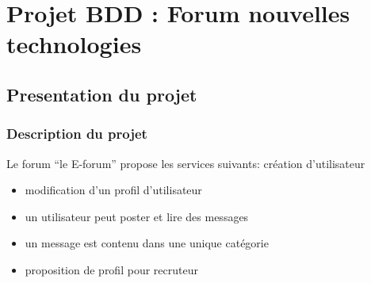 \documentclass{report}
\begin{document}
\part{Projet BDD : Forum nouvelles technologies}
\chapter{Presentation du projet}
\section{Description du projet}



Le forum “le E-forum” propose les services suivants:
création d'utilisateur
\begin{itemize}
\item modification d’un profil d’utilisateur
\item un utilisateur peut poster et lire des messages
\item un message est contenu dans une unique catégorie
\item proposition de profil pour recruteur
\end{itemize}
\end{document}
